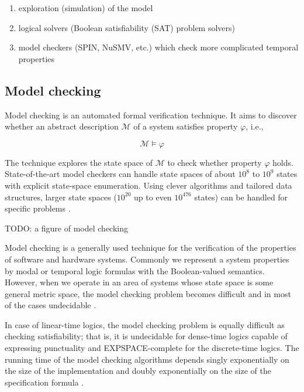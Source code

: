 \begin{enumerate}
    \item exploration (simulation) of the model
    \item logical solvers (Boolean satisfiability (SAT) problem solvers)
    \item model checkers (SPIN, NuSMV, etc.) which check more complicated temporal properties
\end{enumerate}

\subsection{Model checking}

Model checking is an automated formal verification technique. It aims to discover whether an abstract description $\mathcal{M}$ of a system satisfies property $\varphi$, i.e.,

\begin{equation}
    \mathcal{M} \models \varphi
\end{equation}

The technique explores the state space of $\mathcal{M}$ to check whether property $\varphi$ holds. State-of-the-art model checkers can handle state spaces of about $10^8$ to $10^9$ states with explicit state-space enumeration. Using clever algorithms and tailored data structures, larger state spaces ($10^{20}$ up to even $10^{476}$ states) can be handled for specific problems \cite{Baier:ModelChecking}.

TODO: a figure of model checking

Model checking is a generally used technique for the verification of the properties of software and hardware systems. Commonly we represent a system properties by modal or temporal logic formulas with the Boolean-valued semantics. However, when we operate in an area of systems whose state space is some general metric space, the model checking problem becomes difficult and in most of the cases undecidable \cite{Fainekos:RobustnessContinuousTime}.

In case of linear-time logics, the model checking problem is equally difficult as checking satisfiability; that is, it is undecidable for dense-time logics capable of expressing punctuality and EXPSPACE-complete for the discrete-time logics. The running time of the model checking algorithms depends singly exponentially on the size of the implementation and doubly exponentially on the size of the specification formula \cite{Rajeev:ModelsOfRealTime}.

